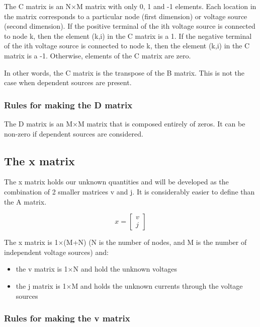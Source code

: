 \documentclass[10pt]{report}
\begin{document}
The C matrix is an N$\times$M matrix with only 0, 1 and -1 elements.
Each location in the matrix corresponds to a particular node (first
dimension) or voltage source (second dimension).  If the positive
terminal of the ith voltage source is connected to node k, then the
element (k,i) in the C matrix is a 1.  If the negative terminal of the
ith voltage source is connected to node k, then the element (k,i) in
the C matrix is a -1.  Otherwise, elements of the C matrix are zero.

\addvspace{12pt}

In other words, the C matrix is the transpose of the B matrix.  This
is not the case when dependent sources are present.

\subsubsection{Rules for making the D matrix}

The D matrix is an M$\times$M matrix that is composed entirely of
zeros.  It can be non-zero if dependent sources are considered.

\subsection{The x matrix}

The x matrix holds our unknown quantities and will be developed as the
combination of 2 smaller matrices v and j.  It is considerably easier
to define than the A matrix.

\begin{equation}
x =
\begin{bmatrix}
v\\
j
\end{bmatrix}
\end{equation}

The x matrix is 1$\times$(M+N) (N is the number of nodes, and M is the
number of independent voltage sources) and:

\begin{itemize}
\item
the v matrix is 1$\times$N and hold the unknown voltages
\item
the j matrix is 1$\times$M and holds the unknown currents through the
voltage sources
\end{itemize}

\subsubsection{Rules for making the v matrix}
\end{document}
